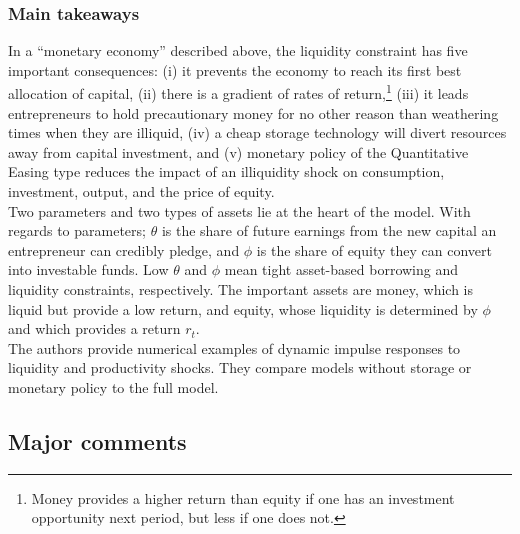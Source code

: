 \documentclass{amsart}
\theoremstyle{definition}
\theoremstyle{remark}
\numberwithin{equation}{section}
\begin{document}
\subsubsection*{Main takeaways} In a ``monetary economy'' described above, the liquidity constraint has five important consequences: (i) it prevents the economy to reach its first best allocation of capital, (ii) there is a gradient of rates of return,\footnote{Money provides a higher return than  equity if one has an investment opportunity next period, but less if one does not.} (iii) it leads entrepreneurs to hold precautionary money for no other reason than weathering times when they are illiquid, (iv) a cheap storage technology will divert resources away from capital investment, and (v) monetary policy of the Quantitative Easing type reduces the impact of an illiquidity shock on consumption, investment, output, and the price of equity.\\

Two parameters and two types of assets lie at the heart of the model. With regards to parameters; $\theta$ is the share of future earnings from the new capital an entrepreneur can credibly pledge, and $\phi$ is the share of equity they can convert into investable funds. Low $\theta$ and $\phi$ mean tight asset-based borrowing and liquidity constraints, respectively. The important assets are money, which is liquid but provide a low return, and equity, whose liquidity is determined by $\phi$ and which provides a return $r_t$. \\

The authors provide numerical examples of dynamic impulse responses to liquidity and productivity shocks. They compare models without storage or monetary policy to the full model.\\

\subsection*{Major comments} 
\end{document}
